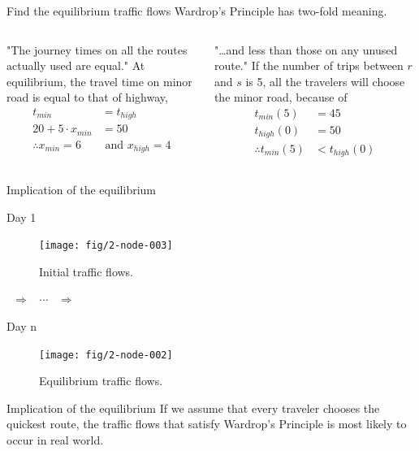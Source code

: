 \documentclass[handout]{beamer}
\begin{document}
\begin{frame}{Find the equilibrium traffic flows}
Wardrop's Principle has two-fold meaning. 
\begin{columns}
\pause
{}
\begin{block}{"The journey times on all the routes actually used are equal."}
At equilibrium, the travel time on minor road is equal to that of highway, 
\begin{align*}
 t_{min} &= t_{high}\\
20 + 5 \cdot x_{min} &= 50 \\
\therefore x_{min} = 6 &\text{ and } x_{high} = 4
\end{align*}
\end{block}
\pause
{}
\begin{block}{"\dots and less than those on any unused route."}
If the number of trips between $r$ and $s$ is 5, all the travelers will choose 
the minor road, because of
\begin{align*}
t_{min}(5) &= 45\\
t_{high}(0) &= 50\\
\therefore t_{min}(5) &< t_{high}(0)
\end{align*}
\end{block}
\end{columns}

\end{frame}

\begin{frame}{Implication of the equilibrium}
\begin{minipage}{.35\linewidth}
\begin{block}{Day 1}
\begin{figure}
\centering
\texttt{[image: fig/2-node-003]}
\caption{Initial traffic flows. }
\end{figure}
\end{block}
\end{minipage}%
~$\Rightarrow$~%
$\cdots$
~$\Rightarrow$~%
\begin{minipage}{.35\linewidth}
\begin{block}{Day n}
\begin{figure}
\centering
\texttt{[image: fig/2-node-002]}
\caption{Equilibrium traffic flows.}
\end{figure}
\end{block}
\end{minipage}
\pause
\begin{block}{Implication of the equilibrium}
If we assume that every traveler chooses the \alert{quickest route}, the traffic flows
that \alert{satisfy Wardrop's Principle} is most likely to occur in real world. 
\end{block}

\end{frame}
\end{document}
